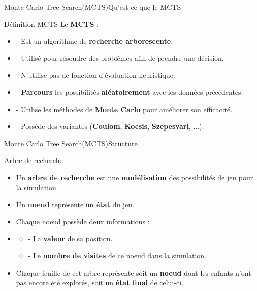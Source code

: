 \begin{frame}{Monte Carlo Tree Search(MCTS)}{Qu'est-ce que le MCTS}
	\begin{block}{Définition MCTS}
		Le \textbf{MCTS} :
		\begin{itemize}
			\item - Est un algorithme de \textbf{recherche arborescente}.
			\item - Utilisé pour résoudre des problèmes afin de prendre une décision.
			\item - N'utilise pas de fonction d'évaluation heuristique.
			\item - \textbf{Parcours} les possibilités \textbf{aléatoirement} avec les données précédentes.
			\item - Utilise les méthodes de \textbf{Monte Carlo} pour améliorer son efficacité.
			\item - Possède des variantes (\textbf{Coulom}, \textbf{Kocsis}, \textbf{Szepesvari}, ...).
		\end{itemize}
	\end{block}
\end{frame}

\begin{frame}{Monte Carlo Tree Search(MCTS)}{Structure}
	\begin{block}{Arbre de recherche}
		\begin{itemize}
			\item Un \textbf{arbre de recherche} est une \textbf{modélisation} des possibilités de jeu pour la simulation.
			\item Un \textbf{noeud} représente un \textbf{état} du jeu.
			\item Chaque noeud possède deux informations :
			\item\begin{itemize}
				      \item - La \textbf{valeur} de sa position.
				      \item - Le \textbf{nombre de visites} de ce noeud dans la simulation.
			      \end{itemize}
			\item Chaque feuille de cet arbre représente soit un \textbf{noeud} dont les enfants n'ont pas encore été explorés, soit un \textbf{état final} de celui-ci.
		\end{itemize}
	\end{block}
\end{frame}

